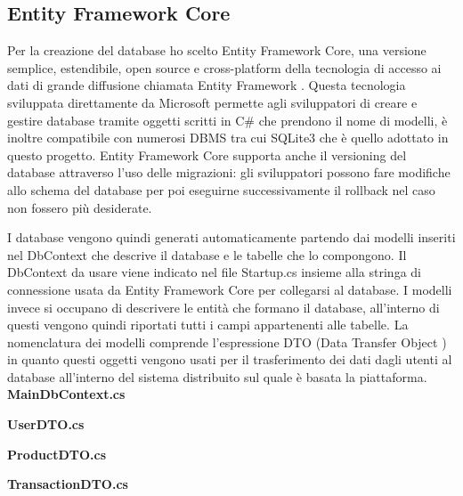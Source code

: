 \subsection{Entity Framework Core}
Per la creazione del database ho scelto Entity Framework Core, una versione semplice, estendibile, open source e cross-platform della tecnologia di accesso ai dati di grande diffusione chiamata Entity Framework  \cite{EFcore}. Questa tecnologia sviluppata direttamente da Microsoft permette agli sviluppatori di creare e gestire database tramite oggetti scritti in C\# che prendono il nome di modelli, è inoltre compatibile con numerosi DBMS tra cui SQLite3 che è quello adottato in questo progetto. Entity Framework Core supporta anche il versioning del database attraverso l'uso delle migrazioni: gli sviluppatori possono fare modifiche allo schema del database per poi eseguirne successivamente il rollback nel caso non fossero più desiderate. 
\medskip

I database vengono quindi generati automaticamente partendo dai modelli inseriti nel DbContext che descrive il database e le tabelle che lo compongono. Il DbContext da usare viene indicato nel file Startup.cs insieme alla stringa di connessione usata da Entity Framework Core per collegarsi al database. I modelli invece si occupano di descrivere le entità che formano il database, all'interno di questi vengono quindi riportati tutti i campi appartenenti alle tabelle. La nomenclatura dei modelli comprende l'espressione DTO (Data Transfer Object \cite{DTO}) in quanto questi oggetti vengono usati per il trasferimento dei dati dagli utenti al database all'interno del sistema distribuito sul quale è basata la piattaforma. 
\bigskip
\clearpage
\textbf{MainDbContext.cs}

\bigskip

\textbf{UserDTO.cs}

\bigskip

\textbf{ProductDTO.cs}

\bigskip

\textbf{TransactionDTO.cs}


